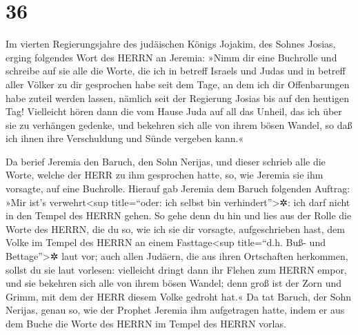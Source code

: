 \hypertarget{section-35}{%
\section{36}\label{section-35}}

Im vierten Regierungsjahre des judäischen Königs Jojakim,
des Sohnes Josias, erging folgendes Wort des HERRN an Jeremia:
»Nimm dir eine Buchrolle und schreibe auf sie alle die
Worte, die ich in betreff Israels und Judas und in betreff aller Völker
zu dir gesprochen habe seit dem Tage, an dem ich dir Offenbarungen habe
zuteil werden lassen, nämlich seit der Regierung Josias bis auf den
heutigen Tag! Vielleicht hören dann die vom Hause Juda auf
all das Unheil, das ich über sie zu verhängen gedenke, und bekehren sich
alle von ihrem bösen Wandel, so daß ich ihnen ihre Verschuldung und
Sünde vergeben kann.«

Da berief Jeremia den Baruch, den Sohn Nerijas, und dieser
schrieb alle die Worte, welche der HERR zu ihm gesprochen hatte, so, wie
Jeremia sie ihm vorsagte, auf eine Buchrolle. Hierauf gab
Jeremia dem Baruch folgenden Auftrag: »Mir ist's verwehrt\textless sup
title=``oder: ich selbst bin verhindert''\textgreater✲: ich darf nicht
in den Tempel des HERRN gehen. So gehe denn du hin und
lies aus der Rolle die Worte des HERRN, die du so, wie ich sie dir
vorsagte, aufgeschrieben hast, dem Volke im Tempel des HERRN an einem
Fasttage\textless sup title=``d.h. Buß- und Bettage''\textgreater✲ laut
vor; auch allen Judäern, die aus ihren Ortschaften herkommen, sollst du
sie laut vorlesen: vielleicht dringt dann ihr Flehen zum
HERRN empor, und sie bekehren sich alle von ihrem bösen Wandel; denn
groß ist der Zorn und Grimm, mit dem der HERR diesem Volke gedroht hat.«
Da tat Baruch, der Sohn Nerijas, genau so, wie der Prophet
Jeremia ihm aufgetragen hatte, indem er aus dem Buche die Worte des
HERRN im Tempel des HERRN vorlas.

